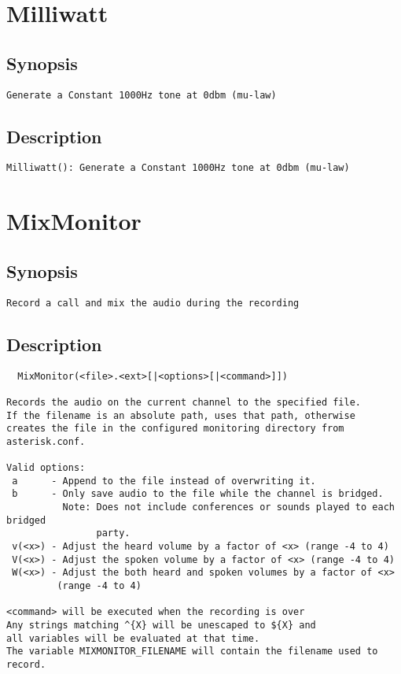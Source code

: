 \section{Milliwatt}
\subsection{Synopsis}
\begin{verbatim}
Generate a Constant 1000Hz tone at 0dbm (mu-law)
\end{verbatim}
\subsection{Description}
\begin{verbatim}
Milliwatt(): Generate a Constant 1000Hz tone at 0dbm (mu-law)

\end{verbatim}


\section{MixMonitor}
\subsection{Synopsis}
\begin{verbatim}
Record a call and mix the audio during the recording
\end{verbatim}
\subsection{Description}
\begin{verbatim}
  MixMonitor(<file>.<ext>[|<options>[|<command>]])

Records the audio on the current channel to the specified file.
If the filename is an absolute path, uses that path, otherwise
creates the file in the configured monitoring directory from
asterisk.conf.

Valid options:
 a      - Append to the file instead of overwriting it.
 b      - Only save audio to the file while the channel is bridged.
          Note: Does not include conferences or sounds played to each bridged
                party.
 v(<x>) - Adjust the heard volume by a factor of <x> (range -4 to 4)
 V(<x>) - Adjust the spoken volume by a factor of <x> (range -4 to 4)
 W(<x>) - Adjust the both heard and spoken volumes by a factor of <x>
         (range -4 to 4)

<command> will be executed when the recording is over
Any strings matching ^{X} will be unescaped to ${X} and 
all variables will be evaluated at that time.
The variable MIXMONITOR_FILENAME will contain the filename used to record.

\end{verbatim}


